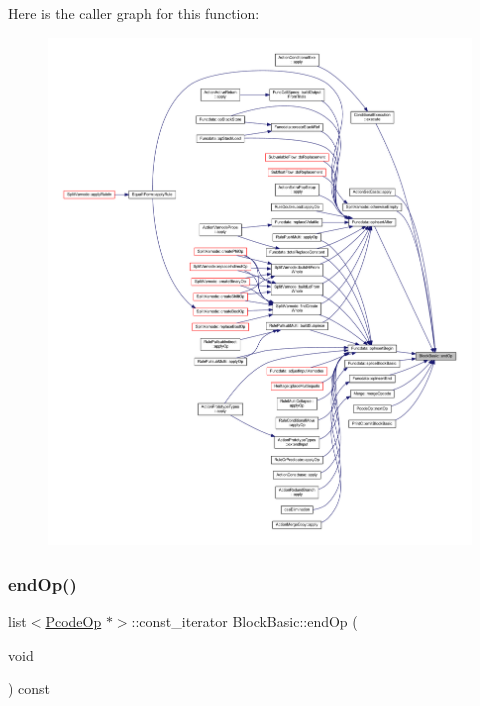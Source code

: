 Here is the caller graph for this function\+:
\nopagebreak
\begin{figure}[H]
\begin{center}
\leavevmode
\includegraphics[width=350pt]{class_block_basic_abd3fc70635403ddb5c85c07b19c6f6b3_icgraph}
\end{center}
\end{figure}
\mbox{\label{class_block_basic_a06c467f9b7b251aa37781d19da122bd5}} 
\subsubsection{\texorpdfstring{endOp()}{endOp()}\hspace{0.1cm}{\footnotesize\ttfamily [2/2]}}
{\footnotesize\ttfamily list$<$\mbox{\hyperlink{class_pcode_op}{Pcode\+Op}} $\ast$$>$\+::const\+\_\+iterator Block\+Basic\+::end\+Op (\begin{DoxyParamCaption}\item[{void}]{ }\end{DoxyParamCaption}) const\hspace{0.3cm}{\ttfamily [inline]}}



